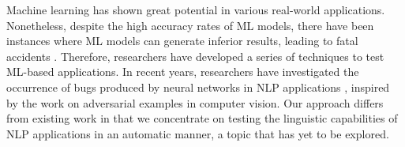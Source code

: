  Machine learning has shown great potential in various real-world applications. Nonetheless, despite the high accuracy rates of ML models, there have been instances where ML models can generate inferior results, leading to fatal accidents \cite{lambert2016understanding, levin2018tesla}. Therefore, researchers have developed a series of techniques \cite{pei2017deepxplore, tian2018deeptest, ma2018deepgauge, hendrycks2021natural, du2019deepstellar, gambi2019automatically, kim2019guiding, ma2018deepmutation, pham2019cradle, xie2019deephunter, chen2022nicgslowdown, zhang2020machine, chen2022deepperform, token_nlp2, character_nlp1, character_nlp2, character_nlp3, nmt_se4} to test ML-based applications. 
In recent years, researchers have investigated the occurrence of bugs produced by neural networks in NLP applications \cite{nmt_se1, nmt_se2, nmt_se3, token_nlp3, token_nlp1, token_nlp2, character_nlp1, character_nlp2, character_nlp3, nmt_se4, li2018textbugger, morris2020textattack, chen2022nmtsloth, sentence_nlp1, maIJCAI2020mtnlp}, inspired by the work on adversarial examples in computer vision.
Our approach differs from existing work in that we concentrate on  testing the linguistic capabilities of NLP applications in an automatic manner, a topic that has yet to be explored.

